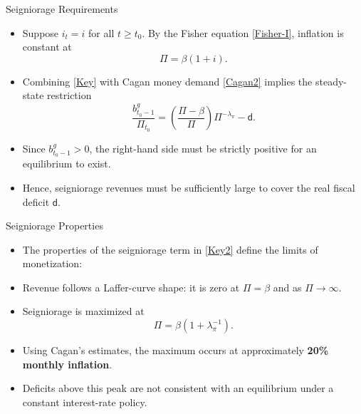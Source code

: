 \documentclass[11pt,aspectratio=169]{beamer}
\begin{document}
\begin{frame}{Seigniorage Requirements}
\small
\begin{itemize}
    \item Suppose \(i_t=i\) for all \(t\ge t_0\). By the Fisher equation \eqref{Fisher-I}, inflation is constant at
    \[
        \Pi=\beta(1+i).
    \]
    \item Combining \eqref{Key} with Cagan money demand \eqref{Cagan2} implies the steady-state restriction
    \begin{equation}
    \frac{b_{t_{0}-1}^{g}}{\Pi _{t_{0}}}
    =\left( \frac{\Pi -\beta }{\Pi }\right)\Pi ^{-\lambda _{\pi }}-\mathsf{d}.
    \label{Key2}
    \end{equation}
    \item Since \(b_{t_0-1}^g>0\), the right-hand side must be strictly positive for an equilibrium to exist.
    \item Hence, seigniorage revenues must be sufficiently large to cover the real fiscal deficit \(\mathsf{d}\).
\end{itemize}
\end{frame}

\begin{frame}{Seigniorage Properties}
\small
\begin{itemize}
    \item The properties of the seigniorage term in \eqref{Key2} define the limits of monetization:
\end{itemize}

\vspace{0.2cm}

\begin{itemize}
    \item Revenue follows a Laffer-curve shape: it is zero at $\Pi=\beta$ and as $\Pi\to\infty$.
    \vspace{0.25em}
    \item Seigniorage is maximized at
    \[
        \Pi=\beta\left(1+\lambda_{\pi}^{-1}\right).
    \]
    \vspace{0.25em}
    \item Using Cagan’s estimates, the maximum occurs at approximately \textbf{20\% monthly inflation}.
    \vspace{0.25em}
    \item Deficits above this peak are not consistent with an equilibrium under a constant interest-rate policy.
\end{itemize}
\end{frame}
\end{document}
